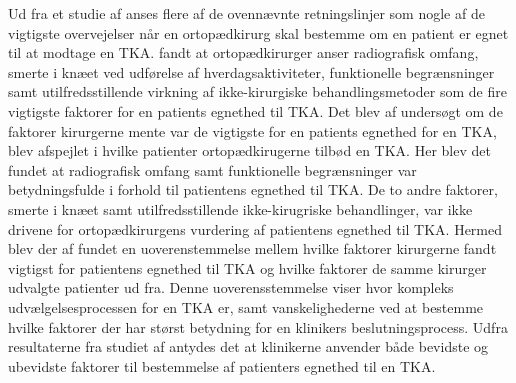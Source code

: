 Ud fra et studie af \cite{skou2016} anses flere af de ovennævnte retningslinjer som nogle af de vigtigste overvejelser når en ortopædkirurg skal bestemme om en patient er egnet til at modtage en TKA. \cite{skou2016} fandt at ortopædkirurger anser radiografisk omfang, smerte i knæet ved udførelse af hverdagsaktiviteter, funktionelle begrænsninger samt utilfredsstillende virkning af ikke-kirurgiske behandlingsmetoder som de fire vigtigste faktorer for en patients egnethed til TKA. Det blev af \cite{skou2016} undersøgt om de faktorer kirurgerne mente var de vigtigste for en patients egnethed for en TKA, blev afspejlet i hvilke patienter ortopædkirugerne tilbød en TKA. Her blev det fundet at radiografisk omfang samt funktionelle begrænsninger var betydningsfulde i forhold til patientens egnethed til TKA. De to andre faktorer, smerte i knæet samt utilfredsstillende ikke-kirugriske behandlinger, var ikke drivene for ortopædkirurgens vurdering af patientens egnethed til TKA. Hermed blev der af \cite{skou2016} fundet en uoverenstemmelse mellem hvilke faktorer kirurgerne fandt vigtigst for patientens egnethed til TKA og hvilke faktorer de samme kirurger udvalgte patienter ud fra. Denne uoverensstemmelse viser hvor kompleks udvælgelsesprocessen for en TKA er, samt vanskelighederne ved at bestemme hvilke faktorer der har størst betydning for en klinikers beslutningsprocess. Udfra resultaterne fra studiet af \cite{skou2016} antydes det at klinikerne anvender både bevidste og ubevidste faktorer til bestemmelse af patienters egnethed til en TKA.    


